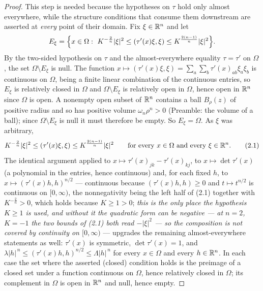 \begin{proof}
This step is needed because the hypotheses on $\tau$ hold only almost
everywhere, while the structure conditions that consume them downstream are
asserted at \emph{every} point of their domain.  Fix $\xi\in\mathbb{R}^n$ and let
\[
E_\xi=\Bigl\{x\in\Omega:\ K^{-\frac2n}|\xi|^2\le(\tau'(x)\xi,\xi)
\le K^{\frac{2(n-1)}n}|\xi|^2\Bigr\}.
\]
By the two-sided hypothesis on $\tau$ and the almost-everywhere equality
$\tau=\tau'$ on $\Omega$, the set $\Omega\setminus E_\xi$ is null.  The function
$x\mapsto(\tau'(x)\xi,\xi)=\sum_a\sum_b\tau'(x)_{ab}\xi_a\xi_b$ is continuous on
$\Omega$, being a finite linear combination of the continuous entries, so
$E_\xi$ is relatively closed in $\Omega$ and $\Omega\setminus E_\xi$ is
relatively open in $\Omega$, hence open in $\mathbb{R}^n$ since $\Omega$ is open.  A
nonempty open subset of $\mathbb{R}^n$ contains a ball $B_\rho(z)$ of positive radius and
so has positive volume $\omega_n\rho^n>0$ (Preamble: the volume of a ball);
since $\Omega\setminus E_\xi$ is null it must therefore be empty.  So
$E_\xi=\Omega$.  As $\xi$ was arbitrary,
\[
K^{-\frac2n}|\xi|^2\le(\tau'(x)\xi,\xi)\le K^{\frac{2(n-1)}n}|\xi|^2
\qquad\text{for every }x\in\Omega\text{ and every }\xi\in\mathbb{R}^n .
\tag{2.1}
\]
The identical argument applied to $x\mapsto\tau'(x)_{jk}-\tau'(x)_{kj}$, to
$x\mapsto\det\tau'(x)$ (a polynomial in the entries, hence continuous) and, for
each fixed $h$, to $x\mapsto(\tau'(x)h,h)^{n/2}$ --- continuous because
$(\tau'(x)h,h)\ge0$ and $t\mapsto t^{n/2}$ is continuous on $[0,\infty)$, the
nonnegativity being the left half of (2.1) together with $K^{-\frac2n}>0$, which
holds because $K\ge1>0$; \emph{this is the only place the hypothesis $K\ge1$ is
used, and without it the quadratic form can be negative --- at $n=2$, $K=-1$ the
two bounds of \textup{(2.1)} both read $-|\xi|^2$ --- so the composition is not
covered by continuity on $[0,\infty)$} --- upgrades the remaining
almost-everywhere statements as well:
$\tau'(x)$ is symmetric, $\det\tau'(x)=1$, and
$\lambda|h|^{\,n}\le(\tau'(x)h,h)^{n/2}\le\Lambda|h|^{\,n}$ for every
$x\in\Omega$ and every $h\in\mathbb{R}^n$.  In each case the set where the asserted
(closed) condition holds is the preimage of a closed set under a function
continuous on $\Omega$, hence relatively closed in $\Omega$; its complement in
$\Omega$ is open in $\mathbb{R}^n$ and null, hence empty.
\end{proof}
